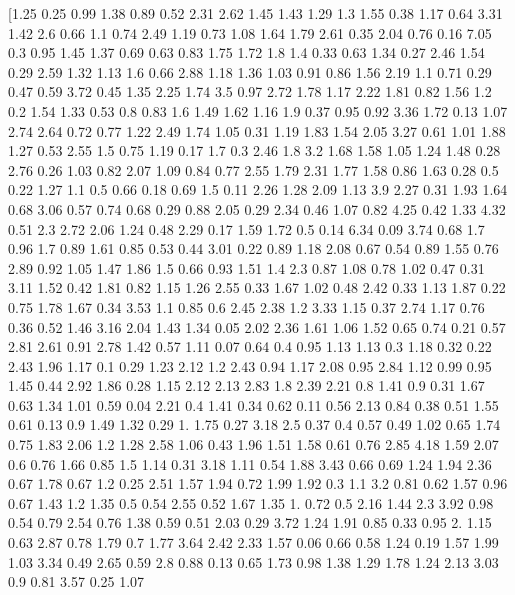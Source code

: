 \documentclass[preview]{standalone}
\begin{document}
\begin{center}
[1.25 0.25 0.99 1.38 0.89 0.52 2.31 2.62 1.45 1.43 1.29 1.3  1.55 0.38
 1.17 0.64 3.31 1.42 2.6  0.66 1.1  0.74 2.49 1.19 0.73 1.08 1.64 1.79
 2.61 0.35 2.04 0.76 0.16 7.05 0.3  0.95 1.45 1.37 0.69 0.63 0.83 1.75
 1.72 1.8  1.4  0.33 0.63 1.34 0.27 2.46 1.54 0.29 2.59 1.32 1.13 1.6
 0.66 2.88 1.18 1.36 1.03 0.91 0.86 1.56 2.19 1.1  0.71 0.29 0.47 0.59
 3.72 0.45 1.35 2.25 1.74 3.5  0.97 2.72 1.78 1.17 2.22 1.81 0.82 1.56
 1.2  0.2  1.54 1.33 0.53 0.8  0.83 1.6  1.49 1.62 1.16 1.9  0.37 0.95
 0.92 3.36 1.72 0.13 1.07 2.74 2.64 0.72 0.77 1.22 2.49 1.74 1.05 0.31
 1.19 1.83 1.54 2.05 3.27 0.61 1.01 1.88 1.27 0.53 2.55 1.5  0.75 1.19
 0.17 1.7  0.3  2.46 1.8  3.2  1.68 1.58 1.05 1.24 1.48 0.28 2.76 0.26
 1.03 0.82 2.07 1.09 0.84 0.77 2.55 1.79 2.31 1.77 1.58 0.86 1.63 0.28
 0.5  0.22 1.27 1.1  0.5  0.66 0.18 0.69 1.5  0.11 2.26 1.28 2.09 1.13
 3.9  2.27 0.31 1.93 1.64 0.68 3.06 0.57 0.74 0.68 0.29 0.88 2.05 0.29
 2.34 0.46 1.07 0.82 4.25 0.42 1.33 4.32 0.51 2.3  2.72 2.06 1.24 0.48
 2.29 0.17 1.59 1.72 0.5  0.14 6.34 0.09 3.74 0.68 1.7  0.96 1.7  0.89
 1.61 0.85 0.53 0.44 3.01 0.22 0.89 1.18 2.08 0.67 0.54 0.89 1.55 0.76
 2.89 0.92 1.05 1.47 1.86 1.5  0.66 0.93 1.51 1.4  2.3  0.87 1.08 0.78
 1.02 0.47 0.31 3.11 1.52 0.42 1.81 0.82 1.15 1.26 2.55 0.33 1.67 1.02
 0.48 2.42 0.33 1.13 1.87 0.22 0.75 1.78 1.67 0.34 3.53 1.1  0.85 0.6
 2.45 2.38 1.2  3.33 1.15 0.37 2.74 1.17 0.76 0.36 0.52 1.46 3.16 2.04
 1.43 1.34 0.05 2.02 2.36 1.61 1.06 1.52 0.65 0.74 0.21 0.57 2.81 2.61
 0.91 2.78 1.42 0.57 1.11 0.07 0.64 0.4  0.95 1.13 1.13 0.3  1.18 0.32
 0.22 2.43 1.96 1.17 0.1  0.29 1.23 2.12 1.2  2.43 0.94 1.17 2.08 0.95
 2.84 1.12 0.99 0.95 1.45 0.44 2.92 1.86 0.28 1.15 2.12 2.13 2.83 1.8
 2.39 2.21 0.8  1.41 0.9  0.31 1.67 0.63 1.34 1.01 0.59 0.04 2.21 0.4
 1.41 0.34 0.62 0.11 0.56 2.13 0.84 0.38 0.51 1.55 0.61 0.13 0.9  1.49
 1.32 0.29 1.   1.75 0.27 3.18 2.5  0.37 0.4  0.57 0.49 1.02 0.65 1.74
 0.75 1.83 2.06 1.2  1.28 2.58 1.06 0.43 1.96 1.51 1.58 0.61 0.76 2.85
 4.18 1.59 2.07 0.6  0.76 1.66 0.85 1.5  1.14 0.31 3.18 1.11 0.54 1.88
 3.43 0.66 0.69 1.24 1.94 2.36 0.67 1.78 0.67 1.2  0.25 2.51 1.57 1.94
 0.72 1.99 1.92 0.3  1.1  3.2  0.81 0.62 1.57 0.96 0.67 1.43 1.2  1.35
 0.5  0.54 2.55 0.52 1.67 1.35 1.   0.72 0.5  2.16 1.44 2.3  3.92 0.98
 0.54 0.79 2.54 0.76 1.38 0.59 0.51 2.03 0.29 3.72 1.24 1.91 0.85 0.33
 0.95 2.   1.15 0.63 2.87 0.78 1.79 0.7  1.77 3.64 2.42 2.33 1.57 0.06
 0.66 0.58 1.24 0.19 1.57 1.99 1.03 3.34 0.49 2.65 0.59 2.8  0.88 0.13
 0.65 1.73 0.98 1.38 1.29 1.78 1.24 2.13 3.03 0.9  0.81 3.57 0.25 1.07

\end{center}
\end{document}
